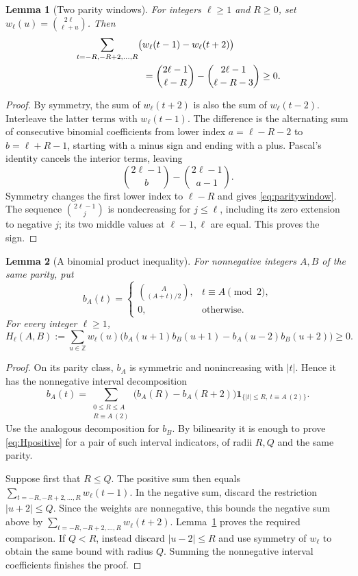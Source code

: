 \documentclass[11pt]{article}
\newtheorem{lemma}{Lemma}
\begin{document}
\begin{lemma}[Two parity windows]\label{lem:paritywindows}
For integers $\ell\geq1$ and $R\geq0$, set
$w_\ell(u)=\binom{2\ell}{\ell+u}$. Then
\begin{align}
 &\sum_{t=-R,-R+2,\ldots,R}
       \bigl(w_\ell(t-1)-w_\ell(t+2)\bigr) \notag\\
 &\hspace{25mm}=
 \binom{2\ell-1}{\ell-R}
 -\binom{2\ell-1}{\ell-R-3}\geq0.
 \label{eq:paritywindow}
\end{align}
\end{lemma}
\begin{proof}
By symmetry, the sum of $w_\ell(t+2)$ is also the sum of
$w_\ell(t-2)$. Interleave the latter terms with $w_\ell(t-1)$.
The difference is the alternating sum of consecutive binomial
coefficients from lower index $a=\ell-R-2$ to
$b=\ell+R-1$, starting with a minus sign and ending with a plus.
Pascal's identity cancels the interior terms, leaving
\[
 \binom{2\ell-1}{b}-\binom{2\ell-1}{a-1}.
\]
Symmetry changes the first lower index to $\ell-R$ and gives
\eqref{eq:paritywindow}. The sequence
$\binom{2\ell-1}{j}$ is nondecreasing for $j\leq\ell$,
including its zero extension to negative $j$; its two middle
values at $\ell-1,\ell$ are equal. This proves the sign.
\end{proof}

\begin{lemma}[A binomial product inequality]\label{lem:binomialproduct}
For nonnegative integers $A,B$ of the same parity, put
\[
 b_A(t)=
 \begin{cases}
 \displaystyle\binom A{(A+t)/2},&t\equiv A\pmod2,\\
 0,&\text{otherwise}.
 \end{cases}
\]
For every integer $\ell\geq1$,
\begin{equation}\label{eq:Hpositive}
 H_\ell(A,B):=\sum_{u\in\mathbb Z}w_\ell(u)
 \bigl(b_A(u+1)b_B(u+1)-b_A(u-2)b_B(u+2)\bigr)\geq0.
\end{equation}
\end{lemma}
\begin{proof}
On its parity class, $b_A$ is symmetric and nonincreasing with
$|t|$. Hence it has the nonnegative interval decomposition
\[
 b_A(t)=
 \sum_{\substack{0\leq R\leq A\\R\equiv A\ (2)}}
 \bigl(b_A(R)-b_A(R+2)\bigr)
 \mathbf1_{\{|t|\leq R,\ t\equiv A\ (2)\}}.
\]
Use the analogous decomposition for $b_B$. By bilinearity it is
enough to prove \eqref{eq:Hpositive} for a pair of such interval
indicators, of radii $R,Q$ and the same parity.

Suppose first that $R\leq Q$. The positive sum then equals
$\sum_{t=-R,-R+2,\ldots,R}w_\ell(t-1)$.
In the negative sum, discard the restriction $|u+2|\leq Q$.
Since the weights are nonnegative, this bounds the negative sum
above by $\sum_{t=-R,-R+2,\ldots,R}w_\ell(t+2)$.
Lemma~\ref{lem:paritywindows} proves the required comparison.
If $Q<R$, instead discard $|u-2|\leq R$ and use symmetry of
$w_\ell$ to obtain the same bound with radius $Q$.
Summing the nonnegative interval coefficients finishes the proof.
\end{proof}
\end{document}
